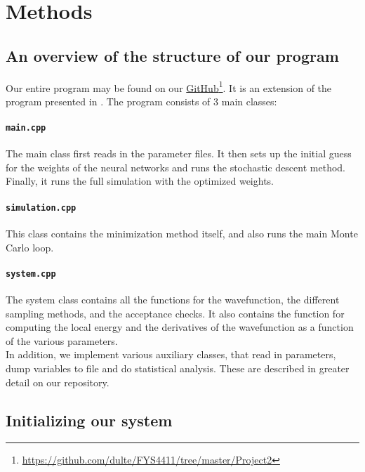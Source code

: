 \documentclass[a4paper, 10pt]{article}
\begin{document}
	\section{Methods}\label{Method_section}
	\subsection{An overview of the structure of our program}
	Our entire program may be found on our \href{https://github.com/dulte/FYS4411/tree/master/Project2}{GitHub}\footnote{\url{https://github.com/dulte/FYS4411/tree/master/Project2}}. It is an extension of the program presented in \cite{Heinsen2018}. The program consists of $3$ main classes:
	\paragraph{\texttt{main.cpp}}
	The main class first reads in the parameter files. It then sets up the initial guess for the weights of the neural networks and runs the stochastic descent method. Finally, it runs the full simulation with the optimized weights.\\
	\paragraph{\texttt{simulation.cpp}}
	This class contains the minimization method itself, and also runs the main Monte Carlo loop.
	\paragraph{\texttt{system.cpp}}
	The system class contains all the functions for the wavefunction, the different sampling methods, and the acceptance checks. It also contains the function for computing the local energy and the derivatives of the wavefunction as a function of the various parameters.\\
	\linebreak
	In addition, we implement various auxiliary classes, that read in parameters, dump variables to file and do statistical analysis. These are described in greater detail on our repository.
	\subsection{Initializing our system}
\end{document}
